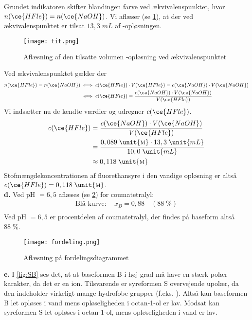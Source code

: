 \documentclass{report}
\begin{document}
Grundet indikatoren skifter blandingen farve ved ækvivalenspunktet, hvor $n(\ce{HFle} )=n(\ce{NaOH} )$.
Vi aflæser (se \cref{fig:tit}), at der ved ækvivalenspunktet er tilsat $13,3 \;\unit{mL} $ af -opløsningen. 
\begin{figure}[H]
\begin{center}
  \texttt{[image: tit.png]}
\end{center}
\caption{Aflæsning af den tilsatte volumen -opløsning ved ækvivalenspunktet}
\label{fig:tit}
\end{figure}
Ved ækvivalenspunktet gælder der 
\begin{equation*}
\begin{split}
  n(\ce{HFle} )=n(\ce{NaOH} ) &\iff c(\ce{HFle} ) \cdot V(\ce{HFle} ) = c(\ce{NaOH} ) \cdot V(\ce{NaOH} )\\
  &\iff c(\ce{HFle} )  = \frac{c(\ce{NaOH} ) \cdot V(\ce{NaOH} )}{V(\ce{HFle} )}
\end{split}
\end{equation*}
Vi indsætter nu de kendte værdier og udregner $c(\ce{HFle} )$.
\begin{equation*}
\begin{split}
  c(\ce{HFle} ) &= \frac{c(\ce{NaOH} ) \cdot V(\ce{NaOH} )}{V(\ce{HFle} )}\\
  &=\frac{0,089 \;\unit{\textsc{m}} \cdot 13,3 \;\unit{mL}  }{10,0 \;\unit{mL} }\\
  &\approx 0,118 \;\unit{\textsc{m}}  
\end{split}
\end{equation*}
Stofmængdekoncentrationen af fluorethansyre i den vandige opløsning er altså $c(\ce{HFle} )=0,118 \;\unit{\textsc{m}}  $.\\[1ex]
\textbf{d.}
Ved pH $=6,5$ aflæses (se \cref{fig:fordeling}) for coumatetralyl:
\begin{equation*}
\begin{split}
  \text{Blå kurve}: \quad x_B=0,88 \quad (88 \;\%)\\
\end{split}
\end{equation*}
Ved pH $=6,5$ er procentdelen af coumatetralyl, der findes på baseform altså $88 \;\%$.
\begin{figure}[H]
\begin{center}
  \texttt{[image: fordeling.png]}
\end{center}
\caption{Aflæsning på fordelingsdiagrammet}
\label{fig:fordeling}
\end{figure}
\noindent \textbf{e.}
I \cref{fig:SB} ses det, at at baseformen B i høj grad må have en stærk polær karakter, da det er en ion.
Tilsvarende er syreformen S overvejende upolær, da den indeholder virkeligt mange hydrofobe grupper (f.eks. ).
Altså kan baseformen B let opløses i vand mens opløseligheden i octan-1-ol er lav.
Modsat kan syreformen S let opløses i octan-1-ol, mens opløseligheden i vand er lav.
\end{document}
